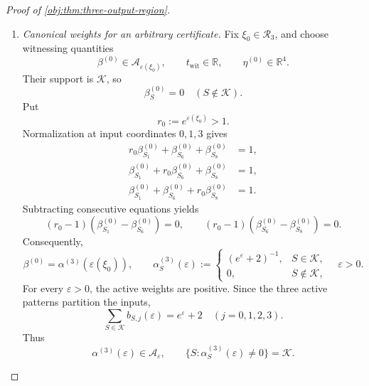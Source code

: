 \documentclass[11pt]{article}
\begin{document}
\begin{proof}[Proof of \cref{obj:thm:three-output-region}]
\begin{enumerate}
\item \textit{Canonical weights for an arbitrary certificate.}
Fix \(\xi_0\in\mathcal R_3\), and choose witnessing quantities
\[
\beta^{(0)}\in\mathcal A_{\varepsilon(\xi_0)},
\qquad t_{\mathrm{wit}}\in\mathbb R,
\qquad \eta^{(0)}\in\mathbb R^4.
\]
Their support is \(\mathcal K\), so
\[
\beta^{(0)}_S=0\quad(S\notin\mathcal K).
\]
Put
\[
r_0:=e^{\varepsilon(\xi_0)}>1.
\]
Normalization at input coordinates \(0,1,3\) gives
\[
\begin{aligned}
r_0\beta^{(0)}_{S_1}+\beta^{(0)}_{S_6}
 +\beta^{(0)}_{S_8}&=1,\\
\beta^{(0)}_{S_1}+r_0\beta^{(0)}_{S_6}
 +\beta^{(0)}_{S_8}&=1,\\
\beta^{(0)}_{S_1}+\beta^{(0)}_{S_6}
 +r_0\beta^{(0)}_{S_8}&=1.
\end{aligned}
\]
Subtracting consecutive equations yields
\[
(r_0-1)(\beta^{(0)}_{S_1}-\beta^{(0)}_{S_6})=0,
\qquad
(r_0-1)(\beta^{(0)}_{S_6}-\beta^{(0)}_{S_8})=0.
\]
Consequently,
\[
\beta^{(0)}=\alpha^{(3)}(\varepsilon(\xi_0)),
\qquad
\alpha^{(3)}_S(\varepsilon):=
\begin{cases}
(e^\varepsilon+2)^{-1},&S\in\mathcal K,\\
0,&S\notin\mathcal K,
\end{cases}
\quad \varepsilon>0.
\]
For every \(\varepsilon>0\), the active weights are positive. Since the three active patterns partition the inputs,
\[
\sum_{S\in\mathcal K}b_{S,j}(\varepsilon)=e^\varepsilon+2
\quad(j=0,1,2,3).
\]
Thus
\[
\alpha^{(3)}(\varepsilon)\in\mathcal A_\varepsilon,
\qquad
\{S:\alpha^{(3)}_S(\varepsilon)\ne0\}=\mathcal K.
\]


\end{enumerate}
\end{proof}
\end{document}

